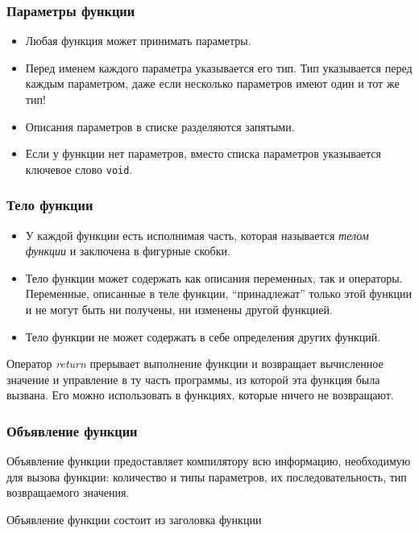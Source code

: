 \subsubsection{Параметры функции}

\begin{itemize}
  \item Любая функция может принимать параметры.
  \item Перед именем каждого параметра указывается его тип. Тип указывается перед каждым параметром, даже если несколько параметров имеют один и тот же тип!
  \item Описания параметров в списке разделяются запятыми.
  \item Если у функции нет параметров, вместо списка параметров указывается ключевое слово \texttt{void}.
\end{itemize}

\subsubsection{Тело функции}

\begin{itemize}
  \item У каждой функции есть исполнимая часть, которая называется \textit{телом функции} и заключена в фигурные скобки.
  \item Тело функции может содержать как описания переменных, так и операторы. Переменные, описанные в теле функции, ``принадлежат'' только этой функции и не могут быть ни получены, ни изменены другой функцией.
  \item Тело функции не может содержать в себе определения других функций.
\end{itemize}

Оператор \textit{return} прерывает выполнение функции и возвращает вычисленное значение и управление в ту часть программы, из которой эта функция была вызвана. Его можно использовать в функциях, которые ничего не возвращают.

\subsubsection{Объявление функции}

Объявление функции предоставляет компилятору всю информацию, необходимую для вызова функции: количество и типы параметров, их последовательность, тип возвращаемого значения.

Объявление функции состоит из заголовка функции

